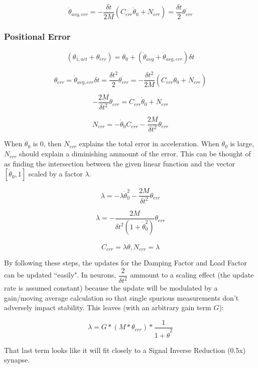 \documentclass[12pt, letterpaper, oneside, notitlepage, onecolumn]{article}
\newcommand{\bbsss}[1]{\subsubsection{#1}}
\begin{document}
\begin{equation}
\dot{\theta}_{avg, err} = - \dfrac{\delta t}{2M}(C_{err} \dot{\theta}_{0} + N_{err}) = \dfrac{\delta t}{2} \ddot{\theta_{err}}
\end{equation}

\bbsss{Positional Error}

\begin{equation}
(\theta_{1, act} + \theta_{err}) = \theta_{0} + (\dot{\theta}_{avg} + \dot{\theta}_{avg, err}) \delta t
\end{equation}

\begin{equation}
\theta_{err} = \dot{\theta}_{avg, err} \delta t = \dfrac{\delta t^{2}}{2} \ddot{\theta_{err}} = - \dfrac{\delta t^{2}}{2M}(C_{err} \dot{\theta}_{0} + N_{err})
\end{equation}

\begin{equation}
- \dfrac{2M}{\delta t^{2}} \theta_{err} = C_{err} \dot{\theta}_{0} + N_{err}
\end{equation}

\begin{equation}
N_{err} = 
- \dot{\theta}_{0} C_{err}
- \dfrac{2M}{\delta t^{2}} \theta_{err}
\end{equation}

When $\dot{\theta}_{0}$ is 0, then $N_{err}$ explains the total error in acceleration. When $\dot{\theta}_{0}$ is large, $N_{err}$ should explain a diminishing ammount of the error. This can be thought of as finding the intersection between the given linear function and the vector $[\dot{\theta}_{0}, 1]$ scaled by a factor $\lambda$.

\begin{equation}
\lambda = 
- \lambda \dot{\theta}_{0}^{2}
- \dfrac{2M}{\delta t^{2}} \theta_{err}
\end{equation}

\begin{equation}
\lambda 
=
- \dfrac{2M}{\delta t^{2} (1 + \dot{\theta}_{0}^{2})} \theta_{err}
\end{equation}

\begin{equation}
C_{err} = \lambda \dot{\theta}, N_{err} = \lambda
\end{equation}

By following these steps, the updates for the Damping Factor and Load Factor can be updated ``easily". In neurons, $\dfrac{2}{\delta t^{2}}$ ammount to a scaling effect (the update rate is assumed constant) because the update will be modulated by a gain/moving average calculation so that single spurious measurements don't adversely impact stability. This leaves (with an arbitrary gain term $G$):

\begin{equation}
\lambda = G * (M * \theta_{err}) * \dfrac{1}{1 + \dot{\theta}^{2}}
\end{equation}

That last term looks like it will fit closely to a Signal Inverse Reduction (0.5x) synapse.
\end{document}
